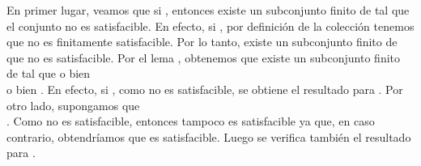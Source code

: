 \begin{isabellebody}
\begin{isamarkuptext}
\begin{demostracion}
    En primer lugar, veamos que si , entonces existe un subconjunto finito  de 
     tal que el conjunto  no es satisfacible. En efecto, si , por 
    definición de la colección  tenemos que  no es finitamente satisfacible. Por lo 
    tanto, existe un subconjunto finito  de  que no es satisfacible. Por el lema 
    , obtenemos que existe un subconjunto finito  de  tal que o bien\\  
    o bien . En efecto, si , como  no es satisfacible, se obtiene el
    resultado para . Por otro lado, supongamos que\\ . Como  no es satisfacible, 
    entonces  tampoco es satisfacible ya que, en caso contrario, obtendríamos que
     es satisfacible. Luego se verifica también el resultado para .


\end{demostracion}
\end{isamarkuptext}
\end{isabellebody}
